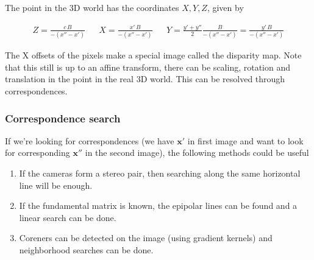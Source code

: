 The point in the 3D world has the coordinates $X, Y, Z$, given by

\begin{align}
    Z = \frac{c \, B}{-(x''-x')}
    &&
    X = \frac{x' \, B}{-(x'' - x')}
    &&
    Y = \frac{y'+y''}{2} \frac{B}{-(x''-x')} = \frac{y' \, B}{-(x'' - x')}
\end{align}

The X offsets of the pixels make a special image called the disparity map. Note that this still is up to an affine transform, there can be scaling, rotation and translation in the point in the real 3D world. This can be resolved through correspondences.

\subsubsection*{Correspondence search}

If we're looking for correspondences (we have $\mathbf{x}'$ in first image and want to look for corresponding $\mathbf{x}''$ in the second image), the following methods could be useful

\begin{enumerate}
    \item If the cameras form a stereo pair, then searching along the same horizontal line will be enough.
    \item If the fundamental matrix is known, the epipolar lines can be found and a linear search can be done.
    \item Coreners can be detected on the image (using gradient kernels) and neighborhood searches can be done.
\end{enumerate}
